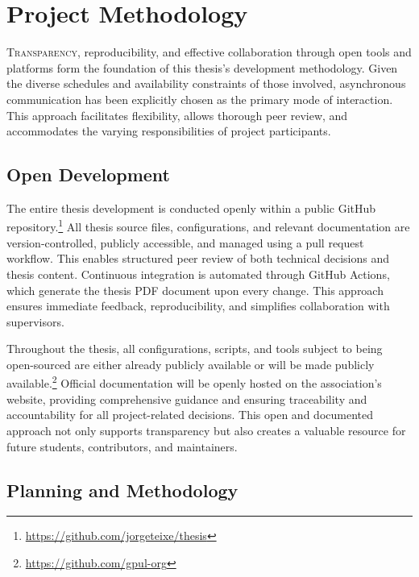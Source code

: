 %

\chapter{Project Methodology}
\label{chap:project-methodology}

\lettrine{T}{ransparency}, reproducibility, and effective collaboration through open tools and platforms form the foundation of this thesis's development methodology. Given the diverse schedules and availability constraints of those involved, asynchronous communication has been explicitly chosen as the primary mode of interaction. This approach facilitates flexibility, allows thorough peer review, and accommodates the varying responsibilities of project participants.

\section{Open Development}

The entire thesis development is conducted openly within a public GitHub repository.\footnote{\url{https://github.com/jorgeteixe/thesis}} All thesis source files, configurations, and relevant documentation are version-controlled, publicly accessible, and managed using a pull request workflow. This enables structured peer review of both technical decisions and thesis content. Continuous integration is automated through GitHub Actions, which generate the thesis PDF document upon every change. This approach ensures immediate feedback, reproducibility, and simplifies collaboration with supervisors.

Throughout the thesis, all configurations, scripts, and tools subject to being open-sourced are either already publicly available or will be made publicly available.\footnote{\url{https://github.com/gpul-org}} Official documentation will be openly hosted on the association's website, providing comprehensive guidance and ensuring traceability and accountability for all project-related decisions. This open and documented approach not only supports transparency but also creates a valuable resource for future students, contributors, and maintainers.

\section{Planning and Methodology}

